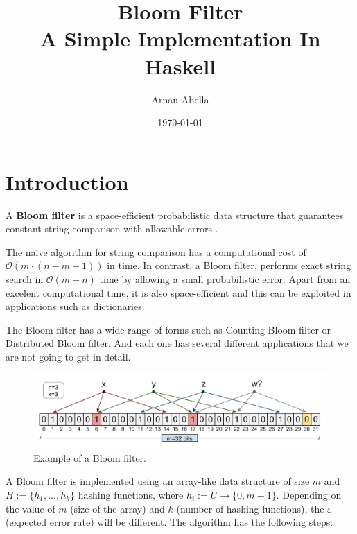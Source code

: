 \documentclass[12pt, a4paper]{article} %
\title{%
  Bloom Filter \\
  \large A Simple Implementation In Haskell}
\author{Arnau Abella}
\date{\today}
\begin{document}
\maketitle

\section{Introduction}\label{s:introduction}

A \textbf{Bloom filter} is a space-efficient probabilistic data structure that guarantees constant string comparison with allowable errors \cite{bloom}.

The na\"ive algorithm for string comparison has a computational cost of \\ $\mathcal{O}(m \cdot (n-m+1))$ in time. In contrast, a Bloom filter, performs exact string search in $\mathcal{O}(m+n)$ time by allowing a small probabilistic error. Apart from an excelent computational time, it is also space-efficient and this can be exploited in applications such as dictionaries.

The Bloom filter has a wide range of forms such as Counting Bloom filter or Distributed Bloom filter. And each one has several different applications that we are not going to get in detail.

\begin{figure}[H]
  \includegraphics[scale=0.3]{bloom-filter}
  \centering
  \caption{Example of a Bloom filter.}
  \label{fig:bloom}
\end{figure}

A Bloom filter is implemented using an array-like data structure of size $m$ and $H := \{h_1, \dots, h_k\}$ hashing functions, where $h_i := U \to \{0, m-1\}$. Depending on the value of $m$ (size of the array) and $k$ (number of hashing functions), the $\varepsilon$ (expected error rate) will be different. The algorithm has the following steps:
\end{document}
